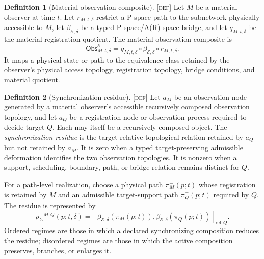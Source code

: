 \documentclass[11pt]{article}
\newcommand{\ObsMap}{\ensuremath{\mathsf{Obs}}}
\newcommand{\SyncRes}{\ensuremath{\rho_{\Sigma}}}
\newcommand{\Defn}{\textsc{[def]}}
\theoremstyle{definition}
\newtheorem{sdefinition}{Definition}
\begin{document}
\begin{sdefinition}[Material observation composite]
\label{def:material-observation-composite}
\Defn{} Let $M$ be a material observer at time $t$. Let
$r_{M,t,\delta}$ restrict a P-space path to the subnetwork physically accessible
to $M$, let $\beta_{\mathcal E,\delta}$ be a typed P-space/A(R)-space bridge, and
let $q_{M,t,\delta}$ be the material registration quotient. The material
observation composite is
\begin{equation}
\ObsMap^{\mathcal E}_{M,t,\delta}=
q_{M,t,\delta}\circ\beta_{\mathcal E,\delta}\circ r_{M,t,\delta}.
\label{eq:material-observation-composite-supp}
\end{equation}
It maps a physical state or path to the equivalence class retained by the
observer's physical access topology, registration topology, bridge conditions, and
material quotient.
\end{sdefinition}

\begin{sdefinition}[Synchronization residue]
\label{def:synchronization-residue}
\Defn{} Let $a_M$ be an observation node generated by a material observer's
accessible recursively composed observation topology, and let $a_Q$ be a
registration node or observation process required to decide target $Q$. Each may
itself be a recursively composed object. The \emph{synchronization residue} is the
target-relative topological relation retained by $a_Q$ but not retained by $a_M$.
It is zero when a typed target-preserving admissible deformation identifies the two
observation topologies. It is nonzero when a support, scheduling, boundary, path,
or bridge relation remains distinct for $Q$.

For a path-level realization, choose a physical path $\pi^-_M(p;t)$ whose
registration is retained by $M$ and an admissible target-support path
$\pi^+_Q(p;t)$ required by $Q$. The residue is represented by
\begin{equation}
\SyncRes^{M,Q}(p;t,\delta)=
\left[
\beta_{\mathcal E,\delta}(\pi^-_M(p;t)),
\beta_{\mathcal E,\delta}(\pi^+_Q(p;t))
\right]_{\mathrm{rel},Q}.
\label{eq:synchronization-residue-supp}
\end{equation}
Ordered regimes are those in which a declared synchronizing composition reduces
the residue; disordered regimes are those in which the active composition
preserves, branches, or enlarges it.
\end{sdefinition}
\end{document}
